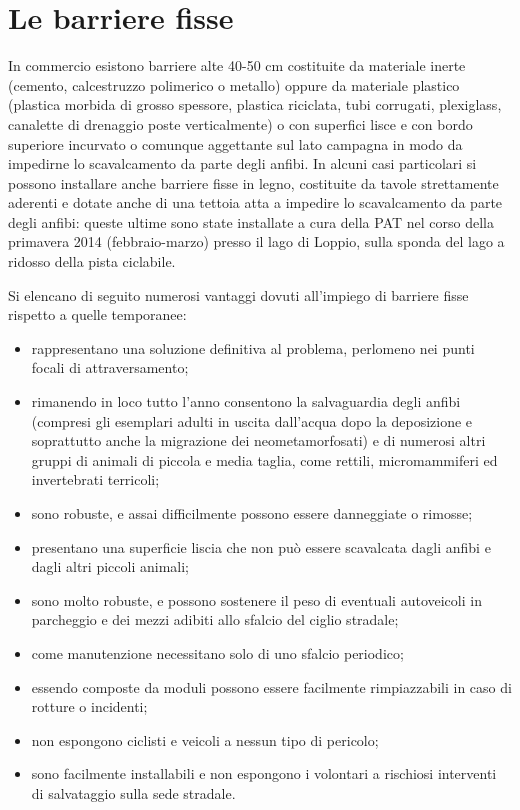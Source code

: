 \documentclass[11pt,a4paper,twoside]{memoir}
\begin{document}
\section{Le barriere fisse}
In commercio esistono barriere alte 40-50 cm costituite da materiale inerte (cemento, calcestruzzo polimerico o metallo) oppure da materiale plastico (plastica morbida di grosso spessore, plastica riciclata, tubi corrugati, plexiglass, canalette di drenaggio poste verticalmente) o con superfici lisce e con bordo superiore incurvato o comunque aggettante sul lato campagna in modo da impedirne lo scavalcamento da parte degli anfibi. In alcuni casi particolari si possono installare anche barriere fisse in legno, costituite da tavole strettamente aderenti e dotate anche di una tettoia atta a impedire lo scavalcamento da parte degli anfibi: queste ultime sono state installate a cura della PAT nel corso della primavera 2014 (febbraio-marzo) presso il lago di Loppio, sulla sponda del lago a ridosso della pista ciclabile.

Si elencano di seguito numerosi vantaggi dovuti all'impiego di barriere fisse rispetto a quelle temporanee:
\begin{itemize}\itemsep0pt
  \item rappresentano una soluzione definitiva al problema, perlomeno nei punti focali di attraversamento;
  \item rimanendo in loco tutto l'anno consentono la salvaguardia degli anfibi (compresi gli esemplari adulti in uscita dall'acqua dopo la deposizione e soprattutto anche la migrazione dei neometamorfosati) e di numerosi altri gruppi di animali di piccola e media taglia, come rettili, micromammiferi ed invertebrati terricoli;
  \item sono robuste, e assai difficilmente possono essere danneggiate o rimosse;
  \item presentano una superficie liscia che non può essere scavalcata dagli anfibi e dagli altri piccoli animali;
  \item sono molto robuste, e possono sostenere il peso di eventuali autoveicoli in parcheggio e dei mezzi adibiti allo sfalcio del ciglio stradale;
  \item come manutenzione necessitano solo di uno sfalcio periodico;
  \item essendo composte da moduli possono essere facilmente rimpiazzabili in caso di rotture o incidenti;
  \item non espongono ciclisti e veicoli a nessun tipo di pericolo;
  \item sono facilmente installabili e non espongono i volontari a rischiosi interventi di salvataggio sulla sede stradale.
\end{itemize}
\end{document}
